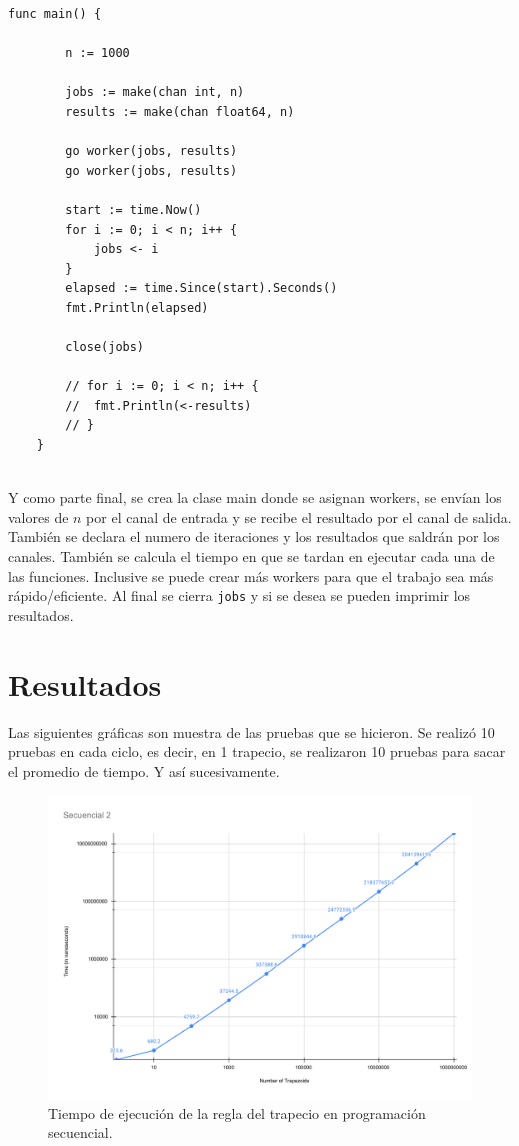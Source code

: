 \documentclass[a4paper]{article}
\begin{document}
\begin{lstlisting}[style=Golang,firstnumber=28]
    func main() {

        n := 1000
    
        jobs := make(chan int, n)
        results := make(chan float64, n)
    
        go worker(jobs, results)
        go worker(jobs, results)
    
        start := time.Now()
        for i := 0; i < n; i++ {
            jobs <- i
        }
        elapsed := time.Since(start).Seconds()
        fmt.Println(elapsed)
    
        close(jobs)
    
        // for i := 0; i < n; i++ {
        // 	fmt.Println(<-results)
        // }
    }
  
\end{lstlisting}
Y como parte final, se crea la clase main donde se asignan workers, se envían los valores de $n$ por el canal de entrada y se recibe el resultado por el canal de salida.
También se declara el numero de iteraciones y los resultados que saldrán por los canales.
También se calcula el tiempo en que se tardan en ejecutar cada una de las funciones.
Inclusive se puede crear más workers para que el trabajo sea más rápido/eficiente.
Al final se cierra \texttt{jobs} y si se desea se pueden imprimir los resultados.
\\

\section{Resultados}
Las siguientes gráficas son muestra de las pruebas que se hicieron.
Se realizó 10 pruebas en cada ciclo, es decir, en 1 trapecio, se realizaron
10 pruebas para sacar el promedio de tiempo. Y así sucesivamente. \\
\begin{figure}[H]
\centering
\includegraphics[width=\textwidth]{Secuencial 2.pdf}
\caption{Tiempo de ejecución de la regla del trapecio en programación secuencial.}
\end{figure}
\end{document}
